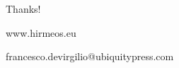 \documentclass[xcolor=svgnames]{beamer}
\begin{document}
        \begin{frame}{Thanks!}
            \begin{center}
                \Huge{www.hirmeos.eu}
            \end{center}
            \vspace{0.5\textheight}
            \begin{center}
                \Large{francesco.devirgilio@ubiquitypress.com}
            \end{center}
        \end{frame}
\end{document}
